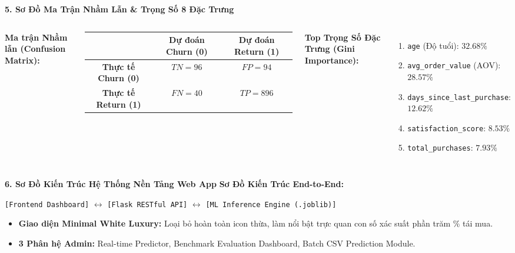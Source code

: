 \documentclass[10pt, aspectratio=169]{beamer}
\begin{document}
\begin{frame}{\textbf{5. Sơ Đồ Ma Trận Nhầm Lẫn \& Trọng Số 8 Đặc Trưng}}
    \begin{columns}
        \textbf{Ma trận Nhầm lẫn (Confusion Matrix):}
        \begin{table}
            \small
            \begin{tabular}{ccc}
                \toprule
                & \textbf{Dự đoán Churn (0)} & \textbf{Dự đoán Return (1)} \\
                \midrule
                \textbf{Thực tế Churn (0)} & $TN = 96$ & $FP = 94$ \\
                \textbf{Thực tế Return (1)} & $FN = 40$ & $TP = 896$ \\
                \bottomrule
            \end{tabular}
        \end{table}

        \textbf{Top Trọng Số Đặc Trưng (Gini Importance):}
        \begin{enumerate}
            \item \texttt{age} (Độ tuổi): $32.68\%$
            \item \texttt{avg\_order\_value} (AOV): $28.57\%$
            \item \texttt{days\_since\_last\_purchase}: $12.62\%$
            \item \texttt{satisfaction\_score}: $8.53\%$
            \item \texttt{total\_purchases}: $7.93\%$
        \end{enumerate}
    \end{columns}
\end{frame}

\begin{frame}{\textbf{6. Sơ Đồ Kiến Trúc Hệ Thống Nền Tảng Web App}}
    \textbf{Sơ Đồ Kiến Trúc End-to-End:}
    \begin{center}
        \small
        \texttt{[Frontend Dashboard]} $\longleftrightarrow$ \texttt{[Flask RESTful API]} $\longleftrightarrow$ \texttt{[ML Inference Engine (.joblib)]}
    \end{center}

    \vspace{0.3cm}
    \begin{itemize}
        \item \textbf{Giao diện Minimal White Luxury:} Loại bỏ hoàn toàn icon thừa, làm nổi bật trực quan con số xác suất phần trăm $\%$ tái mua.
        \item \textbf{3 Phân hệ Admin:} Real-time Predictor, Benchmark Evaluation Dashboard, Batch CSV Prediction Module.
    \end{itemize}
\end{frame}
\end{document}
